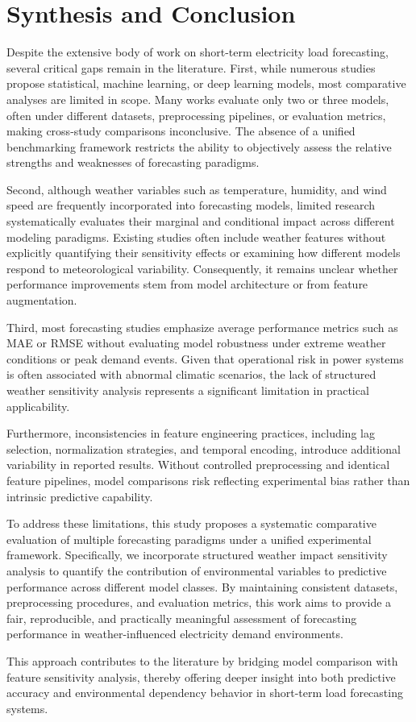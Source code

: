 \documentclass[conference]{IEEEtran}
\begin{document}
\section{Synthesis and Conclusion}
Despite the extensive body of work on short-term electricity load forecasting, several critical gaps remain in the literature. First, while numerous studies propose statistical, machine learning, or deep learning models, most comparative analyses are limited in scope. Many works evaluate only two or three models, often under different datasets, preprocessing pipelines, or evaluation metrics, making cross-study comparisons inconclusive. The absence of a unified benchmarking framework restricts the ability to objectively assess the relative strengths and weaknesses of forecasting paradigms.

Second, although weather variables such as temperature, humidity, and wind speed are frequently incorporated into forecasting models, limited research systematically evaluates their marginal and conditional impact across different modeling paradigms. Existing studies often include weather features without explicitly quantifying their sensitivity effects or examining how different models respond to meteorological variability. Consequently, it remains unclear whether performance improvements stem from model architecture or from feature augmentation.

Third, most forecasting studies emphasize average performance metrics such as MAE or RMSE without evaluating model robustness under extreme weather conditions or peak demand events. Given that operational risk in power systems is often associated with abnormal climatic scenarios, the lack of structured weather sensitivity analysis represents a significant limitation in practical applicability.

Furthermore, inconsistencies in feature engineering practices, including lag selection, normalization strategies, and temporal encoding, introduce additional variability in reported results. Without controlled preprocessing and identical feature pipelines, model comparisons risk reflecting experimental bias rather than intrinsic predictive capability.

To address these limitations, this study proposes a systematic comparative evaluation of multiple forecasting paradigms under a unified experimental framework. Specifically, we incorporate structured weather impact sensitivity analysis to quantify the contribution of environmental variables to predictive performance across different model classes. By maintaining consistent datasets, preprocessing procedures, and evaluation metrics, this work aims to provide a fair, reproducible, and practically meaningful assessment of forecasting performance in weather-influenced electricity demand environments.

This approach contributes to the literature by bridging model comparison with feature sensitivity analysis, thereby offering deeper insight into both predictive accuracy and environmental dependency behavior in short-term load forecasting systems.





\end{document}
